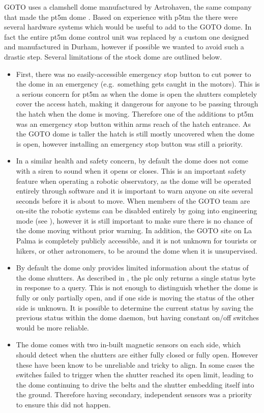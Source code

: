 \begin{colsection}
\begin{colsection}
GOTO uses a clamshell dome manufactured by Astrohaven, the same company that made the pt5m dome \citep{pt5m}. Based on experience with p5tm the there were several hardware systems which would be useful to add to the GOTO dome. In fact the entire pt5m dome control unit was replaced by a custom one designed and manufactured in Durham, however if possible we wanted to avoid such a drastic step. Several limitations of the stock dome are outlined below.
%
\begin{itemize}
    \item First, there was no easily-accessible emergency stop button to cut power to the dome in an emergency (e.g.\ something gets caught in the motors). This is a serious concern for pt5m as when the dome is open the shutters completely cover the access hatch, making it dangerous for anyone to be passing through the hatch when the dome is moving. Therefore one of the additions to pt5m was an emergency stop button within arms reach of the hatch entrance. As the GOTO dome is taller the hatch is still mostly uncovered when the dome is open, however installing an emergency stop button was still a priority.
    \item In a similar health and safety concern, by default the dome does not come with a siren to sound when it opens or closes. This is an important safety feature when operating a robotic observatory, as the dome will be operated entirely through software and it is important to warn anyone on site several seconds before it is about to move. When members of the GOTO team are on-site the robotic systems can be disabled entirely by going into engineering mode (see ), however it is still important to make sure there is no chance of the dome moving without prior warning. In addition, the GOTO site on La Palma is completely publicly accessible, and it is not unknown for tourists or hikers, or other astronomers, to be around the dome when it is unsupervised.
    \item By default the dome  only provides limited information about the status of the dome shutters. As described in , the \gls{plc} only returns a single status byte in response to a query. This is not enough to distinguish whether the dome is fully or only partially open, and if one side is moving the status of the other side is unknown. It is possible to determine the current status by saving the previous status within the dome daemon, but having constant on/off switches would be more reliable.
    \item The dome comes with two in-built magnetic sensors on each side, which should detect when the shutters are either fully closed or fully open. However these have been know to be unreliable and tricky to align. In some cases the switches failed to trigger when the shutter reached its open limit, leading to the dome continuing to drive the belts and the shutter embedding itself into the ground. Therefore having secondary, independent sensors was a priority to ensure this did not happen.

\end{itemize}
\end{colsection}
\end{colsection}
